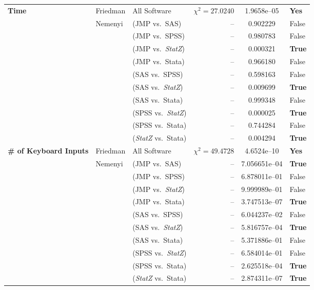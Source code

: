 \documentclass{article}
\begin{document}
\begin{table}[htbp]
{\begin{tabular}{lllrcl}
\multirow{11}{*}{\textbf{Time}}
 & \multirow{1}{*}{Friedman}
    & All Software & $\chi^2 = 27.0240$ & 1.9658e--05 & \textbf{Yes} \\
 \cmidrule(lr){2-6}
 & \multirow{10}{*}{Nemenyi}
    & (JMP vs.\ SAS)   & -- & 0.902229          & False \\
 &  & (JMP vs.\ SPSS)  & -- & 0.980783          & False \\
 &  & (JMP vs.\ \textit{StatZ}) & -- & 0.000321          & \textbf{True} \\
 &  & (JMP vs.\ Stata) & -- & 0.966180          & False \\
 &  & (SAS vs.\ SPSS)  & -- & 0.598163          & False \\
 &  & (SAS vs.\ \textit{StatZ}) & -- & 0.009699          & \textbf{True} \\
 &  & (SAS vs.\ Stata) & -- & 0.999348          & False \\
 &  & (SPSS vs.\ \textit{StatZ})& -- & 0.000025          & \textbf{True} \\
 &  & (SPSS vs.\ Stata)& -- & 0.744284          & False \\
 &  & (\textit{StatZ} vs.\ Stata)& --& 0.004294          & \textbf{True} \\
\midrule

\multirow{11}{*}{\parbox{3.7cm}{\textbf{\# of Keyboard Inputs}}}
 & \multirow{1}{*}{Friedman}
    & All Software & $\chi^2 = 49.4728$ & 4.6524e--10 & \textbf{Yes} \\
 \cmidrule(lr){2-6}
 & \multirow{10}{*}{Nemenyi}
    & (JMP vs.\ SAS)    & -- & 7.056651e--04  & \textbf{True} \\
 &  & (JMP vs.\ SPSS)   & -- & 6.878011e--01  & False \\
 &  & (JMP vs.\ \textit{StatZ})  & -- & 9.999989e--01  & False \\
 &  & (JMP vs.\ Stata)  & -- & 3.747513e--07  & \textbf{True} \\
 &  & (SAS vs.\ SPSS)   & -- & 6.044237e--02  & False \\
 &  & (SAS vs.\ \textit{StatZ})  & -- & 5.816757e--04  & \textbf{True} \\
 &  & (SAS vs.\ Stata)  & -- & 5.371886e--01  & False \\
 &  & (SPSS vs.\ \textit{StatZ}) & -- & 6.584014e--01  & False \\
 &  & (SPSS vs.\ Stata) & -- & 2.625518e--04  & \textbf{True} \\
 &  & (\textit{StatZ} vs.\ Stata)& -- & 2.874311e--07  & \textbf{True} \\
\midrule


\end{tabular}}
\end{table}
\end{document}
